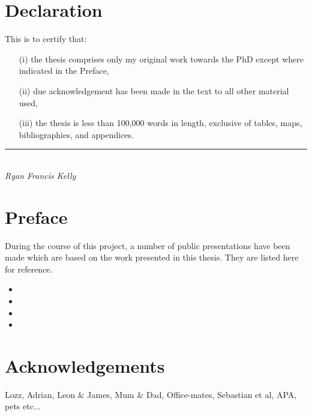 

\chapter*{Declaration}
This is to certify that:
\begin{itemize}
\item[(i)] the thesis comprises only my original work towards the PhD except where indicated in the Preface,
\item[(ii)] due acknowledgement has been made in the text to all other material used,
\item[(iii)] the thesis is less than 100,000 words in length, exclusive of tables, maps, bibliographies, and appendices.
\end{itemize}
\vspace{3cm}
\rule{70mm}{0.1mm}\\
\emph{Ryan Francis Kelly}

\chapter*{Preface}
During the course of this project, a number of public presentations have been
 made which are based on the work presented in this thesis. They are listed
 here for reference.

\nobibliography*
\begin{itemize}
\item {}
\item {}
\item {}
\item {}
\end{itemize}


\chapter*{Acknowledgements} %

Lozz, Adrian, Leon \& James, Mum \& Dad, Office-mates, Sebastian et al, APA, pets etc...

\singlespace
\cleardoublepage
\tableofcontents
\listoftables
\listoffigures

\cleardoublepage
\onehalfspace
{}











\singlespace

\appendix



